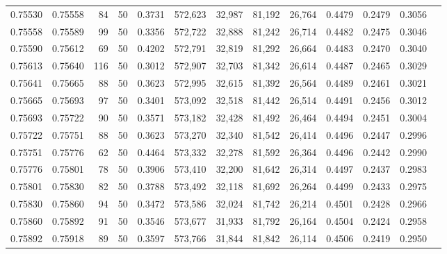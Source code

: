 \begin{tabular}{rrrrrrrrrrrrr}
0.75530 & 0.75558 &    84 &  50 &                                     0.3731 & 572,623 &  32,987 &  81,192 &  26,764 & 0.4479 & 0.2479 & 0.3056 \\
0.75558 & 0.75589 &    99 &  50 &                                     0.3356 & 572,722 &  32,888 &  81,242 &  26,714 & 0.4482 & 0.2475 & 0.3046 \\
0.75590 & 0.75612 &    69 &  50 &                                     0.4202 & 572,791 &  32,819 &  81,292 &  26,664 & 0.4483 & 0.2470 & 0.3040 \\
0.75613 & 0.75640 &   116 &  50 &                                     0.3012 & 572,907 &  32,703 &  81,342 &  26,614 & 0.4487 & 0.2465 & 0.3029 \\
0.75641 & 0.75665 &    88 &  50 &                                     0.3623 & 572,995 &  32,615 &  81,392 &  26,564 & 0.4489 & 0.2461 & 0.3021 \\
0.75665 & 0.75693 &    97 &  50 &                                     0.3401 & 573,092 &  32,518 &  81,442 &  26,514 & 0.4491 & 0.2456 & 0.3012 \\
0.75693 & 0.75722 &    90 &  50 &                                     0.3571 & 573,182 &  32,428 &  81,492 &  26,464 & 0.4494 & 0.2451 & 0.3004 \\
0.75722 & 0.75751 &    88 &  50 &                                     0.3623 & 573,270 &  32,340 &  81,542 &  26,414 & 0.4496 & 0.2447 & 0.2996 \\
0.75751 & 0.75776 &    62 &  50 &                                     0.4464 & 573,332 &  32,278 &  81,592 &  26,364 & 0.4496 & 0.2442 & 0.2990 \\
0.75776 & 0.75801 &    78 &  50 &                                     0.3906 & 573,410 &  32,200 &  81,642 &  26,314 & 0.4497 & 0.2437 & 0.2983 \\
0.75801 & 0.75830 &    82 &  50 &                                     0.3788 & 573,492 &  32,118 &  81,692 &  26,264 & 0.4499 & 0.2433 & 0.2975 \\
0.75830 & 0.75860 &    94 &  50 &                                     0.3472 & 573,586 &  32,024 &  81,742 &  26,214 & 0.4501 & 0.2428 & 0.2966 \\
0.75860 & 0.75892 &    91 &  50 &                                     0.3546 & 573,677 &  31,933 &  81,792 &  26,164 & 0.4504 & 0.2424 & 0.2958 \\
0.75892 & 0.75918 &    89 &  50 &                                     0.3597 & 573,766 &  31,844 &  81,842 &  26,114 & 0.4506 & 0.2419 & 0.2950 \\

\end{tabular}
